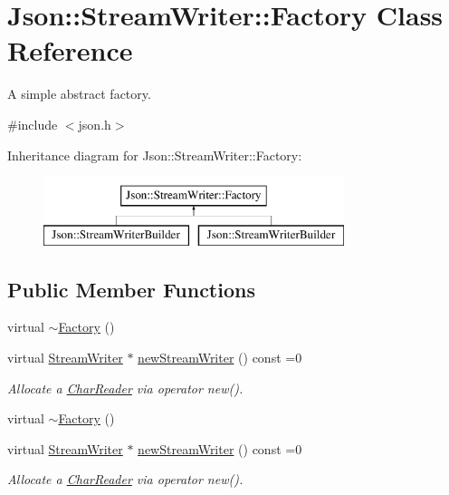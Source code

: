 \hypertarget{class_json_1_1_stream_writer_1_1_factory}{}\section{Json\+:\+:Stream\+Writer\+:\+:Factory Class Reference}
\label{class_json_1_1_stream_writer_1_1_factory}


A simple abstract factory.  




{\ttfamily \#include $<$json.\+h$>$}

Inheritance diagram for Json\+:\+:Stream\+Writer\+:\+:Factory\+:\begin{figure}[H]
\begin{center}
\leavevmode
\includegraphics[height=2.000000cm]{class_json_1_1_stream_writer_1_1_factory}
\end{center}
\end{figure}
\subsection*{Public Member Functions}
\begin{DoxyCompactItemize}
\item 
virtual \hyperlink{class_json_1_1_stream_writer_1_1_factory_ad334ad5e81e3b9b1768620a446366ff1}{$\sim$\+Factory} ()
\item 
virtual \hyperlink{class_json_1_1_stream_writer}{Stream\+Writer} $\ast$ \hyperlink{class_json_1_1_stream_writer_1_1_factory_a9d30ec53e8288cd53befccf1009c5f31}{new\+Stream\+Writer} () const =0
\begin{DoxyCompactList}\small\item\em Allocate a \hyperlink{class_json_1_1_char_reader}{Char\+Reader} via operator new(). \end{DoxyCompactList}\item 
virtual \hyperlink{class_json_1_1_stream_writer_1_1_factory_a9f886907e7de963285731420f98890e4}{$\sim$\+Factory} ()
\item 
virtual \hyperlink{class_json_1_1_stream_writer}{Stream\+Writer} $\ast$ \hyperlink{class_json_1_1_stream_writer_1_1_factory_a9d30ec53e8288cd53befccf1009c5f31}{new\+Stream\+Writer} () const =0
\begin{DoxyCompactList}\small\item\em Allocate a \hyperlink{class_json_1_1_char_reader}{Char\+Reader} via operator new(). \end{DoxyCompactList}\end{DoxyCompactItemize}


